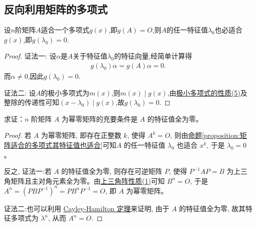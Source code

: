 \documentclass[../../main.tex]{subfiles}%
\begin{document}
\subsection{反向利用矩阵的多项式}

\begin{proposition}\label{proposition:矩阵适合的多项式其特征值也适合}
设$n$阶矩阵$A$适合一个多项式$g(x)$,即$g(A) = O$,则$A$的任一特征值$\lambda_0$也必适合$g(x)$,即$g(\lambda_0) = 0$.
\end{proposition}
\begin{proof}

{\color{blue}证法一:}
设$\alpha$是$A$关于特征值$\lambda_0$的特征向量,经简单计算得
\begin{align*}
g(\lambda_0) \alpha = g(A) \alpha = 0.
\end{align*}
而$\alpha \neq 0$,因此$g(\lambda_0) = 0$.

{\color{blue}证法二:}
设$A$的极小多项式为$m(x)$,则$m(x)\mid g(x)$,由\hyperref[proposition:极小多项式的性质]{极小多项式的性质(5)}及整除的传递性可知$(x-\lambda_0)\mid g(x)$,故$g(\lambda_0)=0.$

\end{proof}

\begin{proposition}[幂零矩阵关于特征值的充要条件]\label{proposition:幂零矩阵关于特征值的充要条件}
求证：$n$ 阶矩阵 $A$ 为幂零矩阵的充要条件是 $A$ 的特征值全为零。
\end{proposition}
\begin{proof}

若 $A$ 为幂零矩阵, 即存在正整数 $k$, 使得 $A^k = O$, 则由\hyperref[proposition:矩阵适合的多项式其特征值也适合]{命题\ref{proposition:矩阵适合的多项式其特征值也适合}}可知$A$ 的任一特征值 $\lambda_0$ 也适合 $x^k$, 于是 $\lambda_0 = 0$。

反之,
{\color{blue}证法一:}若 $A$ 的特征值全为零, 则存在可逆矩阵 $P$, 使得 $P^{-1}AP = B$ 为上三角矩阵且主对角元素全为零。由\hyperref[proposition:上三角阵性质]{上三角阵性质(1)}可知 $B^n = O$, 于是 $A^n = (PBP^{-1})^n = PB^nP^{-1} = O$, 即 $A$ 为幂零矩阵。

{\color{blue}证法二:}也可以利用 \hyperref[theorem:Cayley-Hamilton定理]{Cayley-Hamilton 定理}来证明, 由于 $A$ 的特征值全为零, 故其特征多项式为 $\lambda^n$, 从而 $A^n = O$.

\end{proof}
\end{document}
